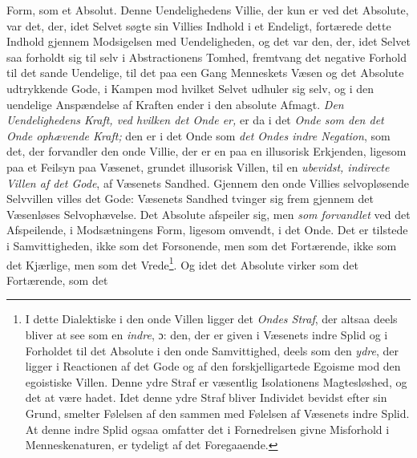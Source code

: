 Form, som et Absolut. Denne Uendelighedens Villie, der kun er ved det Absolute,
var det, der, idet Selvet søgte sin Villies Indhold i et Endeligt, fortærede
dette Indhold gjennem Modsigelsen med Uendeligheden, og det var den, der, idet
Selvet saa forholdt sig til selv i Abstractionens Tomhed, fremtvang det negative
Forhold til det sande Uendelige, til det paa een Gang Menneskets Væsen og det
Absolute udtrykkende Gode, i Kampen mod hvilket
 \setcounter{footnote}{0}%
Selvet udhuler sig selv, og i den uendelige Anspændelse af Kraften ender i den
absolute Afmagt. \emph{Den Uendelighedens Kraft, ved hvilken det Onde er,} er da
i det \emph{Onde som den det Onde ophævende Kraft;} den er i det Onde som
\emph{det Ondes indre Negation}, som det, der forvandler den onde Villie, der er
en paa en illusorisk Erkjenden, ligesom paa et Feilsyn paa Væsenet, grundet
illusorisk Villen, til en \emph{ubevidst, indirecte Villen af det Gode}, af
Væsenets Sandhed. Gjennem den onde Villies selvopløsende Selvvillen villes det
Gode: Væsenets Sandhed tvinger sig frem gjennem det Væsenløses Selvophævelse. Det
Absolute afspeiler sig, men \emph{som forvandlet} ved det Afspeilende, i
Modsætningens Form, ligesom omvendt, i det Onde. Det er tilstede i
Samvittigheden, ikke som det Forsonende, men som det Fortærende, ikke som det
Kjærlige, men som det Vrede\footnote{I dette Dialektiske i den onde Villen ligger
det \emph{Ondes Straf}, der altsaa deels bliver at see som en \emph{indre}, ɔ:
den, der er given i Væsenets indre Splid og i Forholdet til det Absolute i den
onde Samvittighed, deels som den \emph{ydre}, der ligger i Reactionen af det Gode
og af den forskjelligartede Egoisme mod den egoistiske Villen. Denne ydre Straf
er væsentlig Isolationens Magtesløshed, og det at være hadet. Idet denne ydre
Straf bliver Individet bevidst efter sin Grund, smelter Følelsen af den sammen
med Følelsen af Væsenets indre Splid. At denne indre Splid ogsaa omfatter det i
Fornedrelsen givne Misforhold i Menneskenaturen, er tydeligt af det
Foregaaende.}. Og idet det Absolute virker som det Fortærende, som det
